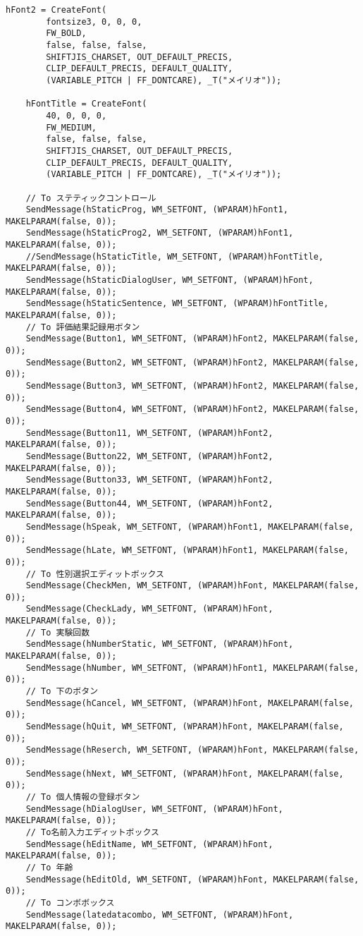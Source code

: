 \begin{lstlisting}[caption=window.cpp]
	hFont2 = CreateFont(
		fontsize3, 0, 0, 0,
		FW_BOLD,
		false, false, false,
		SHIFTJIS_CHARSET, OUT_DEFAULT_PRECIS,
		CLIP_DEFAULT_PRECIS, DEFAULT_QUALITY,
		(VARIABLE_PITCH | FF_DONTCARE), _T("メイリオ"));

	hFontTitle = CreateFont(
		40, 0, 0, 0,
		FW_MEDIUM,
		false, false, false,
		SHIFTJIS_CHARSET, OUT_DEFAULT_PRECIS,
		CLIP_DEFAULT_PRECIS, DEFAULT_QUALITY,
		(VARIABLE_PITCH | FF_DONTCARE), _T("メイリオ"));

	// To ステティックコントロール
	SendMessage(hStaticProg, WM_SETFONT, (WPARAM)hFont1, MAKELPARAM(false, 0));
	SendMessage(hStaticProg2, WM_SETFONT, (WPARAM)hFont1, MAKELPARAM(false, 0));
	//SendMessage(hStaticTitle, WM_SETFONT, (WPARAM)hFontTitle, MAKELPARAM(false, 0));
	SendMessage(hStaticDialogUser, WM_SETFONT, (WPARAM)hFont, MAKELPARAM(false, 0));
	SendMessage(hStaticSentence, WM_SETFONT, (WPARAM)hFontTitle, MAKELPARAM(false, 0));
	// To 評価結果記録用ボタン
	SendMessage(Button1, WM_SETFONT, (WPARAM)hFont2, MAKELPARAM(false, 0));
	SendMessage(Button2, WM_SETFONT, (WPARAM)hFont2, MAKELPARAM(false, 0));
	SendMessage(Button3, WM_SETFONT, (WPARAM)hFont2, MAKELPARAM(false, 0));
	SendMessage(Button4, WM_SETFONT, (WPARAM)hFont2, MAKELPARAM(false, 0));
	SendMessage(Button11, WM_SETFONT, (WPARAM)hFont2, MAKELPARAM(false, 0));
	SendMessage(Button22, WM_SETFONT, (WPARAM)hFont2, MAKELPARAM(false, 0));
	SendMessage(Button33, WM_SETFONT, (WPARAM)hFont2, MAKELPARAM(false, 0));
	SendMessage(Button44, WM_SETFONT, (WPARAM)hFont2, MAKELPARAM(false, 0));
	SendMessage(hSpeak, WM_SETFONT, (WPARAM)hFont1, MAKELPARAM(false, 0));
	SendMessage(hLate, WM_SETFONT, (WPARAM)hFont1, MAKELPARAM(false, 0));
	// To 性別選択エディットボックス
	SendMessage(CheckMen, WM_SETFONT, (WPARAM)hFont, MAKELPARAM(false, 0));
	SendMessage(CheckLady, WM_SETFONT, (WPARAM)hFont, MAKELPARAM(false, 0));
	// To 実験回数
	SendMessage(hNumberStatic, WM_SETFONT, (WPARAM)hFont, MAKELPARAM(false, 0));
	SendMessage(hNumber, WM_SETFONT, (WPARAM)hFont1, MAKELPARAM(false, 0));
	// To 下のボタン
	SendMessage(hCancel, WM_SETFONT, (WPARAM)hFont, MAKELPARAM(false, 0));
	SendMessage(hQuit, WM_SETFONT, (WPARAM)hFont, MAKELPARAM(false, 0));
	SendMessage(hReserch, WM_SETFONT, (WPARAM)hFont, MAKELPARAM(false, 0));
	SendMessage(hNext, WM_SETFONT, (WPARAM)hFont, MAKELPARAM(false, 0));
	// To 個人情報の登録ボタン
	SendMessage(hDialogUser, WM_SETFONT, (WPARAM)hFont, MAKELPARAM(false, 0));
	// To名前入力エディットボックス
	SendMessage(hEditName, WM_SETFONT, (WPARAM)hFont, MAKELPARAM(false, 0));
	// To 年齢
	SendMessage(hEditOld, WM_SETFONT, (WPARAM)hFont, MAKELPARAM(false, 0));
	// To コンボボックス
	SendMessage(latedatacombo, WM_SETFONT, (WPARAM)hFont, MAKELPARAM(false, 0));


\end{lstlisting}
